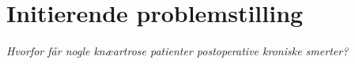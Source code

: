 
\section{Initierende problemstilling}
\begin{center}
	\textit{Hvorfor får nogle knæartrose patienter postoperative kroniske smerter?}
\end{center}

%
%
%
%
%
%
